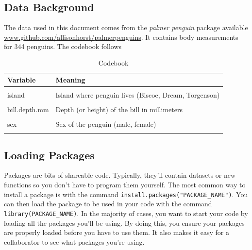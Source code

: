 \documentclass[
]{article}
\begin{document}
\hypertarget{data-background}{%
\subsection{Data Background}\label{data-background}}

The data used in this document comes from the \emph{palmer penguin}
package available \url{www.github.com/allisonhorst/palmerpenguins}. It
contains body measurements for 344 penguins. The codebook follows

\begin{table}

\caption{\label{tab:unnamed-chunk-1}Codebook}
\centering
\begin{tabular}[t]{ll}
\toprule
Variable & Meaning\\
\midrule
\cellcolor{gray!6}{Species} & \cellcolor{gray!6}{The species of the penguin (Adelie, Chinstrap, Gentoo)}\\
island & Island where penguin lives (Biscoe, Dream, Torgenson)\\
\cellcolor{gray!6}{bill.length.mm} & \cellcolor{gray!6}{Length of the bill in millimeters}\\
bill.depth.mm & Depth (or height) of the bill in millimeters\\
\cellcolor{gray!6}{body.mass.g} & \cellcolor{gray!6}{Body mass of the penguin in grams}\\
\addlinespace
sex & Sex of the penguin (male, female)\\
\cellcolor{gray!6}{year} & \cellcolor{gray!6}{Year the measurement was taken (2007, 2008, 2009)}\\
\bottomrule
\end{tabular}
\end{table}

\hypertarget{loading-packages}{%
\subsection{Loading Packages}\label{loading-packages}}

Packages are bits of shareable code. Typically, they'll contain datasets
or new functions so you don't have to program them yourself. The most
common way to install a package is with the command
\texttt{install.packages("PACKAGE\_NAME")}. You can then load the
package to be used in your code with the command
\texttt{library(PACKAGE\_NAME)}. In the majority of cases, you want to
start your code by loading all the packages you'll be using. By doing
this, you ensure your packages are properly loaded before you have to
use them. It also makes it easy for a collaborator to see what packages
you're using.
\end{document}
